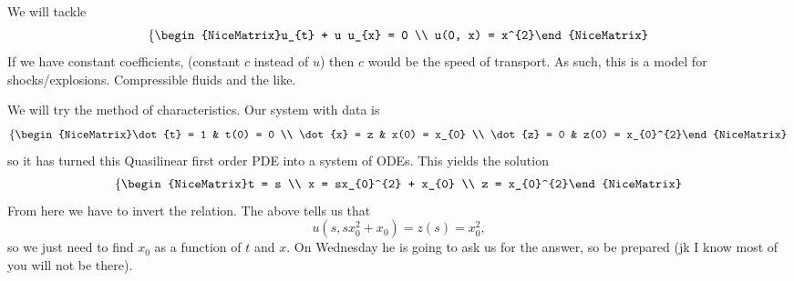 \begin{example}
	We will tackle
	\[ \left\{\begin{NiceMatrix}u_{t} + u u_{x} = 0 \\ u(0, x) = x^{2}\end{NiceMatrix}\right.  \]
	\[  \]
	If we have constant coefficients, (constant \( c \) instead of \( u \)) then \( c \) would be the speed of transport. As such, this is a model for shocks/explosions. Compressible fluids and the like.

	We will try the method of characteristics. Our system with data is
	\[ \left\{\begin{NiceMatrix}\dot{t} = 1 & t(0) = 0 \\ \dot{x} = z & x(0) = x_{0} \\ \dot{z} = 0 & z(0) = x_{0}^{2}\end{NiceMatrix}\right.  \]
	so it has turned this Quasilinear first order PDE into a system of ODEs. This yields the solution
	\[ \left\{\begin{NiceMatrix}t = s \\ x = sx_{0}^{2} + x_{0} \\ z = x_{0}^{2}\end{NiceMatrix}\right.  \]
	From here we have to invert the relation. The above tells us that
	\[ u(s, sx_{0}^{2} + x_{0}) = z(s) = x_{0}^{2}, \]
	so we just need to find \( x_{0} \) as a function of \( t \) and \( x \). On Wednesday he is going to ask us for the answer, so be prepared (jk I know most of you will not be there).
\end{example}
